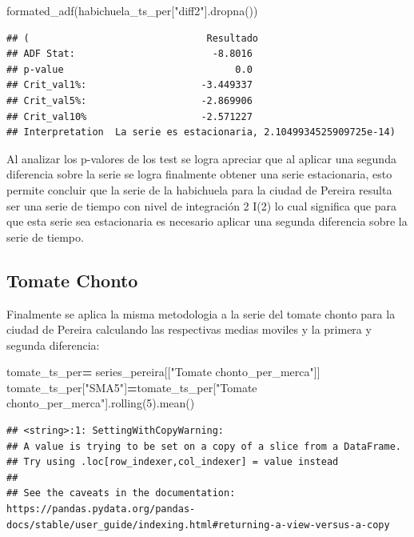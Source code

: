 \documentclass[
]{book}
\newenvironment{Shaded}{\begin{snugshade}}{\end{snugshade}}
\newcommand{\DecValTok}[1]{\textcolor[rgb]{0.00,0.00,0.81}{#1}}
\newcommand{\NormalTok}[1]{#1}
\newcommand{\OperatorTok}[1]{\textcolor[rgb]{0.81,0.36,0.00}{\textbf{#1}}}
\newcommand{\StringTok}[1]{\textcolor[rgb]{0.31,0.60,0.02}{#1}}
\begin{document}
\begin{Shaded}
\begin{Highlighting}[]
\NormalTok{formated\_adf(habichuela\_ts\_per[}\StringTok{"diff2"}\NormalTok{].dropna())}
\end{Highlighting}
\end{Shaded}

\begin{verbatim}
## (                               Resultado
## ADF Stat:                        -8.8016
## p-value                              0.0
## Crit_val1%:                    -3.449337
## Crit_val5%:                    -2.869906
## Crit_val10%                    -2.571227
## Interpretation  La serie es estacionaria, 2.1049934525909725e-14)
\end{verbatim}

Al analizar los p-valores de los test se logra apreciar que al aplicar una segunda diferencia sobre la serie se logra finalmente obtener una serie estacionaria, esto permite concluir que la serie de la habichuela para la ciudad de Pereira resulta ser una serie de tiempo con nivel de integración 2 I(2) lo cual significa que para que esta serie sea estacionaria es necesario aplicar una segunda diferencia sobre la serie de tiempo.

\hypertarget{tomate-chonto-1}{%
\subsection{Tomate Chonto}\label{tomate-chonto-1}}

Finalmente se aplica la misma metodologia a la serie del tomate chonto para la ciudad de Pereira calculando las respectivas medias moviles y la primera y segunda diferencia:

\begin{Shaded}
\begin{Highlighting}[]

\NormalTok{tomate\_ts\_per}\OperatorTok{=}\NormalTok{ series\_pereira[[}\StringTok{"Tomate chonto\_per\_merca"}\NormalTok{]]}
\NormalTok{tomate\_ts\_per[}\StringTok{"SMA5"}\NormalTok{]}\OperatorTok{=}\NormalTok{tomate\_ts\_per[}\StringTok{"Tomate chonto\_per\_merca"}\NormalTok{].rolling(}\DecValTok{5}\NormalTok{).mean()}
\end{Highlighting}
\end{Shaded}

\begin{verbatim}
## <string>:1: SettingWithCopyWarning: 
## A value is trying to be set on a copy of a slice from a DataFrame.
## Try using .loc[row_indexer,col_indexer] = value instead
## 
## See the caveats in the documentation: https://pandas.pydata.org/pandas-docs/stable/user_guide/indexing.html#returning-a-view-versus-a-copy
\end{verbatim}
\end{document}

